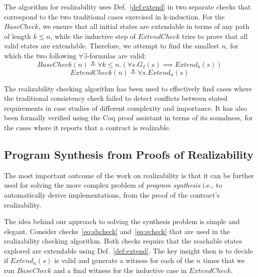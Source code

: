 The algorithm for realizability uses Def.~\ref{def:extend} in two
separate checks that correspond to the two traditional cases exercised in
k-induction. For the $\mathit{BaseCheck}$, we ensure that all initial states are
extendable in terms of any path of length $k\le n$, while the inductive step of
$\mathit{ExtendCheck}$ tries to prove that all valid states are extendable.
Therefore, we attempt to find the smallest $n$, for which the two following 
$\forall\exists$-formulas are valid:%
%
\begin{equation}
\label{eq:sbcheck}
\mathit{BaseCheck}(n) \triangleq \forall k \leq n. (\forall s. G_I(s)
	  	\implies \mathit{Extend}_k(s))
\end{equation}%
%
\begin{equation}
\label{eq:echeck}
\mathit{ExtendCheck}(n) \triangleq \forall s. \mathit{Extend}_n(s)
\end{equation}

The realizability checking algorithm has been used to effectively find cases
where the traditional consistency check failed to detect conflicts between
stated requirements in case studies of different complexity and importance. It
has also been formally verified using the Coq proof assistant in terms of its
soundness, for the cases where it reports that a contract is realizable.

\subsection{Program Synthesis from Proofs of Realizability}

The most important outcome of the work on realizability is that it 
 can be further used for solving the more complex problem of
\emph{program synthesis} i.e., to automatically
derive implementations, from the proof of the contract's
realizability.

The idea behind our approach to solving the synthesis problem is
simple and elegant. Consider checks~\eqref{eq:sbcheck} and~\eqref{eq:echeck} that
are used in the realizability checking algorithm. Both checks require
that the reachable states explored are extendable using
Def.~\ref{def:extend}.
The key insight then is to decide if $\mathit{Extend}_{n}(s)$ is valid and generate a witness 
for each of the $n$ times that we run $\mathit{BaseCheck}$ and a final witness 
for the inductive case in $\mathit{ExtendCheck}$.

